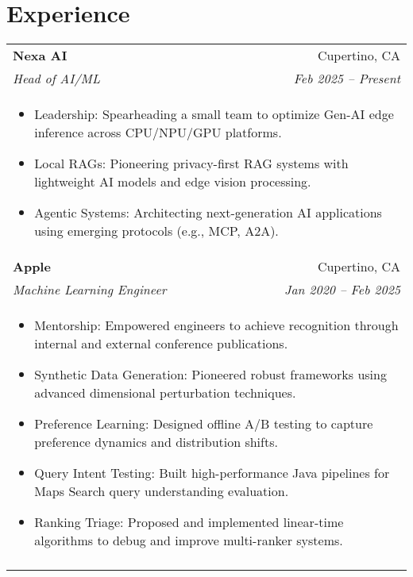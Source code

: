 \documentclass[letterpaper,11pt]{article}
\begin{document}
\section{Experience}
\begin{tabular*}{0.97\textwidth}[t]{l@{\extracolsep{\fill}}r}
  \textbf{Nexa AI} & Cupertino, CA \\
  \textit{\small Head of AI/ML} & \textit{\small Feb 2025 -- Present} \\
  \multicolumn{2}{l}{
    \begin{minipage}{\textwidth}
      \vspace{0.3em}
      \begin{itemize}[leftmargin=*, itemsep=-4.5pt, topsep=0pt, label={\raisebox{0.4ex}{\tiny\textbullet}}]
        \item  Leadership: Spearheading a small team to optimize Gen-AI edge inference across CPU/NPU/GPU platforms.
        \item  Local RAGs: Pioneering privacy-first RAG systems with lightweight AI models and edge vision processing.
        \item  Agentic Systems: Architecting next-generation AI applications using emerging protocols (e.g., MCP, A2A).
      \end{itemize}
    \end{minipage}
  } \\
  \noalign{\vspace{0.7em}}

  \textbf{Apple} & Cupertino, CA \\
  \textit{\small Machine Learning Engineer} & \textit{\small Jan 2020 -- Feb 2025} \\
  \multicolumn{2}{l}{
    \begin{minipage}{\textwidth}
      \vspace{0.3em}
      \begin{itemize}[leftmargin=*, itemsep=-4.5pt, topsep=0pt, label={\raisebox{0.4ex}{\tiny\textbullet}}]       
        \item  Mentorship: Empowered engineers to achieve recognition through internal and external conference publications.
        \item  Synthetic Data Generation: Pioneered robust frameworks using advanced dimensional perturbation techniques.
        \item  Preference Learning: Designed offline A/B testing to capture preference dynamics and distribution shifts.
        \item  Query Intent Testing: Built high-performance Java pipelines for Maps Search query understanding evaluation.
        \item  Ranking Triage: Proposed and implemented linear-time algorithms to debug and improve multi-ranker systems.
      \end{itemize}
    \end{minipage}
  } \\
  \noalign{\vspace{0.7em}}


\end{tabular*}
\end{document}
